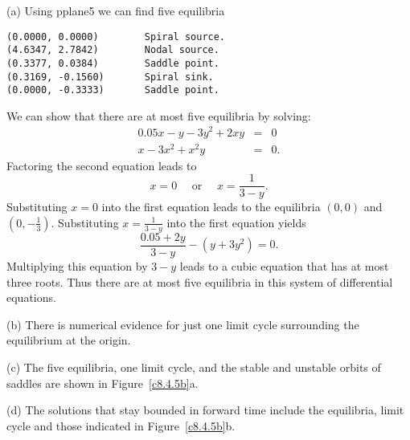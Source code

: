 \soln  (a)  Using {\sf pplane5} we can find five equilibria
\begin{verbatim}
(0.0000, 0.0000)        Spiral source.           
(4.6347, 2.7842)        Nodal source.            
(0.3377, 0.0384)        Saddle point.            
(0.3169, -0.1560)       Spiral sink.             
(0.0000, -0.3333)       Saddle point.            
\end{verbatim}
We can show that there are at most five equilibria by solving:
\begin{eqnarray*}
0.05x - y - 3y^2 + 2xy & = & 0\\
x - 3x^2 + x^2y & = & 0.
\end{eqnarray*}  
Factoring the second equation leads to 
\[
x=0 \quad \mbox{ or } \quad x = \frac{1}{3-y}.
\]
Substituting $x=0$ into the first equation leads to the equilibria
$(0,0)$ and $(0,-\frac{1}{3})$. Substituting $x = \frac{1}{3-y}$ into the
first equation yields
\[
\frac{0.05+2y}{3-y} -(y+3y^2)=0.
\]
Multiplying this equation by $3-y$ leads to a cubic equation that has at most
three roots.  Thus there are at most five equilibria in this system of
differential equations.

\noindent (b) There is numerical evidence for just one limit cycle
surrounding the equilibrium at the origin.

\noindent (c)  The five equilibria, one limit cycle, and the stable and
unstable orbits of saddles are shown in Figure~\ref{c8.4.5b}a.

\noindent (d)  The solutions that stay bounded in forward time include the
equilibria, limit cycle and those indicated in Figure~\ref{c8.4.5b}b.

\begin{figure}[htb]
                       \centerline{%
			}
\end{figure}

